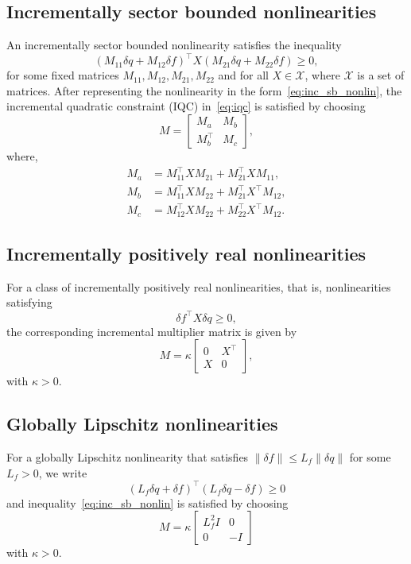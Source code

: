 \documentclass[times, doublespace]{rncauth}
\begin{document}
\subsection{Incrementally sector bounded nonlinearities}
An incrementally sector bounded nonlinearity satisfies the inequality
\begin{equation}
( M_{11}\delta  q +  M_{12}\delta  f)^\top  X ( M_{21}\delta  q +  M_{22}\delta  f) \ge  0,
\label{eq:inc_sb_nonlin}
\end{equation}
for some fixed matrices $ M_{11},  M_{12},  M_{21}, M_{22}$ and for all $ X\in\mathcal{X}$, where $\mathcal{X}$ is a set of matrices.
After representing the nonlinearity in the form~\eqref{eq:inc_sb_nonlin}, the incremental quadratic constraint (IQC) in~\eqref{eq:iqc} is satisfied by choosing
\[
M = \begin{bmatrix}  M_a &  M_b \\  M_b^\top &  M_c
\end{bmatrix},
\]
where,
\begin{align*}
M_a &=  M_{11}^\top  X  M_{21} +  M_{21}^\top  X  M_{11},\\
M_b &=  M_{11}^\top  X  M_{22} +  M_{21}^\top  X^\top  M_{12},\\
M_c &=  M_{12}^\top  X  M_{22} +  M_{22}^\top  X^\top  M_{12}.
\end{align*}

\subsection{Incrementally positively real nonlinearities}
For a class of incrementally positively real nonlinearities, that is, nonlinearities satisfying $$\delta f^\top X \delta q \ge 0,$$ the corresponding incremental multiplier matrix is given by
\begin{equation*}
M = \kappa \begin{bmatrix}
0 & X^\top \\ X & 0
\end{bmatrix},
\end{equation*}
with $\kappa>0$.

\subsection{Globally Lipschitz nonlinearities}
For a globally Lipschitz nonlinearity that satisfies $\|\delta  f\|\leq L_f \|\delta  q\|$ for some $L_f > 0$, we write \[
(L_f \delta  q+\delta  f)^\top (L_f\delta  q-\delta  f) \geq  0
\]
and inequality~\eqref{eq:inc_sb_nonlin} is satisfied by choosing
\[
M = \kappa\begin{bmatrix}
L_f^2 I & 0 \\ 0 & -I
\end{bmatrix}
\]
with $\kappa >0$.
\end{document}
